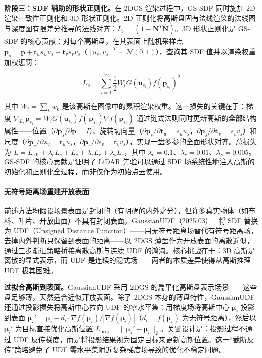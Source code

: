 \textbf{阶段三：SDF 辅助的形状正则化。}在 2DGS 渲染过程中，GS-SDF 同时施加 2D 渲染一致性正则化和 3D 形状正则化。2D 正则化将高斯盘固有法线渲染的法线图与深度图有限差分推导的法线对齐：$L_r = (1 - \mathbf{N}^T \hat{\mathbf{N}})$。3D 形状正则化是 GS-SDF 的核心贡献：对每个高斯盘，在其表面上随机采样点 $\mathbf{p}_s = \mathbf{p} + \mathbf{t}_u s_u u_s + \mathbf{t}_v s_v v_s$（$[u_s, v_s]^T \sim \mathcal{N}(0,1)$），查询其 SDF 值并以渲染权重加权惩罚：

\begin{equation}
L_s = \sum_{i=1}^{12} \frac{1}{2} W_i G(\mathbf{u}_{s_i}) f(\mathbf{p}_{s_i})^2
\end{equation}

其中 $W_i = \sum_k w_k$ 是该高斯在图像中的累积渲染权重。这一损失的关键在于：梯度 $\nabla_{L_s} \mathbf{p}_{s_i} = W_i G(\mathbf{u}_{s_i}) f(\mathbf{p}_{s_i}) \nabla f(\mathbf{p}_{s_i})$ 通过链式法则同时更新高斯的\textbf{全部}结构属性——位置（$\partial \mathbf{p}_s / \partial \mathbf{p} = I$）、旋转切向量（$\partial \mathbf{p}_s / \partial \mathbf{t}_u = s_u u_s$，$\partial \mathbf{p}_s / \partial \mathbf{t}_v = s_v v_s$）和尺度（$\partial \mathbf{p}_s / \partial s_u = \mathbf{t}_u u_s$，$\partial \mathbf{p}_s / \partial s_v = \mathbf{t}_v v_s$），实现一盘多参的全面形状对齐。总损失为 $L = L_{\text{sdf}} + \lambda_e L_e + L_c + \lambda_r L_r + \lambda_s L_s$，其中 $\lambda_e = 0.1$、$\lambda_r = 0.01$、$\lambda_s = 0.005$。GS-SDF 的核心贡献是证明了 LiDAR 先验可以通过 SDF 场系统性地注入高斯的初始化和正则化全过程，而非仅作为初始点云使用。

\paragraph{无符号距离场重建开放表面}

前述方法均假设场景表面是封闭的（有明确的内外之分），但许多真实物体（如布料、叶片、开放曲面）不具有封闭表面。GaussianUDF（2025.03）~\cite{2503_19458} 将 SDF 替换为 UDF（Unsigned Distance Function）——用无符号距离场替代有符号距离场，去掉内外判断只保留到表面的距离——以 2DGS 薄盘作为开放表面的离散近似，通过三步渐进策略桥接离散高斯与连续 UDF 的鸿沟。核心挑战在于：3D 高斯是离散的显式表示，而 UDF 是连续的隐式场——两者的本质差异使得从高斯推理 UDF 极其困难。

\textbf{过拟合高斯到表面。}GaussianUDF 采用 2DGS 的扁平化高斯盘表示场景——这些盘足够薄，天然适合近似开放表面。除了 2DGS 本身的薄盘特性，GaussianUDF 还通过投影损失将高斯中心拉向 UDF 的零水平集：用梯度场将高斯中心 $\boldsymbol{\mu}_i$ 投影到表面 $\boldsymbol{\mu}_i' = \boldsymbol{\mu}_i - d_i \cdot \nabla f(\boldsymbol{\mu}_i) / |\nabla f(\boldsymbol{\mu}_i)|$（$d_i = f(\boldsymbol{\mu}_i)$ 为无符号距离），然后以 $\boldsymbol{\mu}_i'$ 为目标直接优化高斯位置 $L_{\text{proj}} = \|\boldsymbol{\mu}_i' - \boldsymbol{\mu}_i\|_2$。关键设计是：投影过程不通过 UDF 反传梯度，而是将投影结果视为固定目标来更新高斯位置。这一“截断反传”策略避免了 UDF 零水平集附近复杂梯度场导致的优化不稳定问题。

